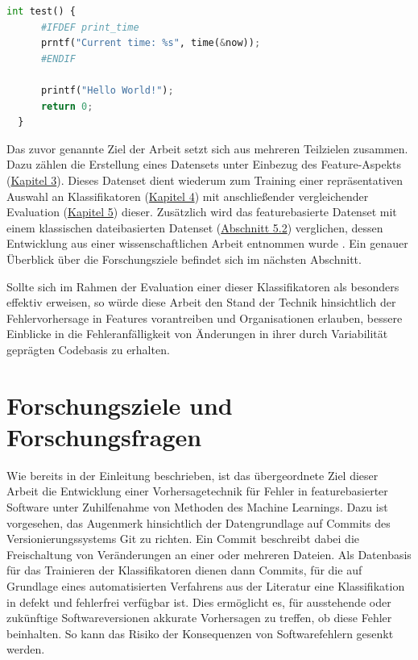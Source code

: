 \begin{lstlisting}[language=Python, caption=Exemplarische Darstellung eines fehlerhaften Features, frame=single, label=bug-code]
int test() {
	  #IFDEF print_time
	  prntf("Current time: %s", time(&now));
	  #ENDIF

	  printf("Hello World!");
	  return 0;
  }
\end{lstlisting}
 
Das zuvor genannte Ziel der Arbeit setzt sich aus mehreren Teilzielen zusammen. Dazu zählen die Erstellung eines Datensets unter Einbezug des Feature-Aspekts (\hyperref[dataset-creation]{Kapitel 3}). Dieses Datenset dient wiederum zum Training einer repräsentativen Auswahl an Klassifikatoren (\hyperref[training]{Kapitel 4}) mit anschließender vergleichender Evaluation (\hyperref[evaluation]{Kapitel 5}) dieser. Zusätzlich wird das featurebasierte Datenset mit einem klassischen dateibasierten Datenset (\hyperref[classic-eval]{Abschnitt 5.2}) verglichen, dessen Entwicklung aus einer wissenschaftlichen Arbeit entnommen wurde \cite{Moser2008}. Ein genauer Überblick über die Forschungsziele befindet sich im nächsten Abschnitt.

Sollte sich im Rahmen der Evaluation einer dieser Klassifikatoren als besonders effektiv erweisen, so würde diese Arbeit den Stand der Technik hinsichtlich der Fehlervorhersage in Features vorantreiben und Organisationen erlauben, bessere Einblicke in die Fehleranfälligkeit von Änderungen in ihrer durch Variabilität geprägten Codebasis zu erhalten.

\section{Forschungsziele und Forschungsfragen}

Wie bereits in der Einleitung beschrieben, ist das übergeordnete Ziel dieser Arbeit die Entwicklung einer Vorhersagetechnik für Fehler in featurebasierter Software unter Zuhilfenahme von Methoden des Machine Learnings. Dazu ist vorgesehen, das Augenmerk hinsichtlich der Datengrundlage auf Commits des Versionierungssystems Git zu richten. Ein Commit beschreibt dabei die Freischaltung von Veränderungen an einer oder mehreren Dateien. Als Datenbasis für das Trainieren der Klassifikatoren dienen dann Commits, für die auf Grundlage eines automatisierten Verfahrens aus der Literatur eine Klassifikation in \glqq defekt\grqq{} und \glqq fehlerfrei\grqq{} verfügbar ist. Dies ermöglicht es, für ausstehende oder zukünftige Softwareversionen akkurate Vorhersagen zu treffen, ob diese Fehler beinhalten. So kann das Risiko der Konsequenzen von Softwarefehlern gesenkt werden.

